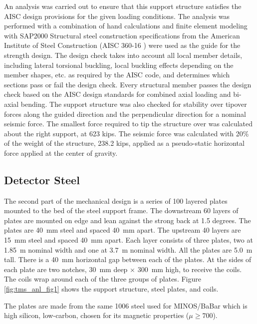 An analysis was carried out to ensure that this support structure satisfies the AISC design provisions for the given loading conditions.  The analysis was performed with a combination of hand calculations and finite element modeling with SAP2000 %
Structural steel construction specifications from the American Institute of Steel Construction (AISC 360-16 
) were used as the guide for the strength design.  The design check takes into account all local member details, including lateral torsional buckling, local buckling effects depending on the member shapes, etc. as required by the AISC code, and determines which sections pass or fail the design check. Every structural member passes the design check based on the AISC design standards for combined axial loading and bi-axial bending.  The support structure was also checked for stability over tipover forces along the guided direction and the perpendicular direction for a nominal seismic force.   The smallest force required to tip the structure over was calculated about the right support, at 623 kips. The seismic force was calculated with 20\% of the weight of the structure, 238.2 kips, applied as a pseudo-static horizontal force applied at the center of gravity.
   

\subsection{Detector Steel}
\label{sec:tms-des-steel}

The second part of the mechanical design is a series of \num{100} layered plates mounted to the bed of the steel support frame. The downstream \num{60} layers of plates are mounted on edge and lean against the strong back at \num{1.5} degrees. The plates are \SI{40}{\mm} steel and spaced \SI{40}{\mm} apart. The upstream \num{40} layers are \SI{15}{\mm} steel and spaced \SI{40}{\mm} apart. Each layer consists of three plates, two at \SI{1.85}{\m} nominal width and one at \SI{3.7}{\m} nominal width. All the plates are \SI{5.0}{\m} tall. There is a \SI{40}{\mm} horizontal gap between each of the plates.   At the sides of each plate are two notches, \SI{30}{\mm} deep $\times$ \SI{300}{\mm} high, to receive the coils. The coils wrap around each of the three groups of plates.   Figure \ref{fig:tms_anl_fig1} shows the support structure, steel plates, and coils.  


The plates are made from the same 1006 steel used for  MINOS/BaBar which is high silicon, low-carbon, chosen for its magnetic properties ($\mu \ge 700$). 



